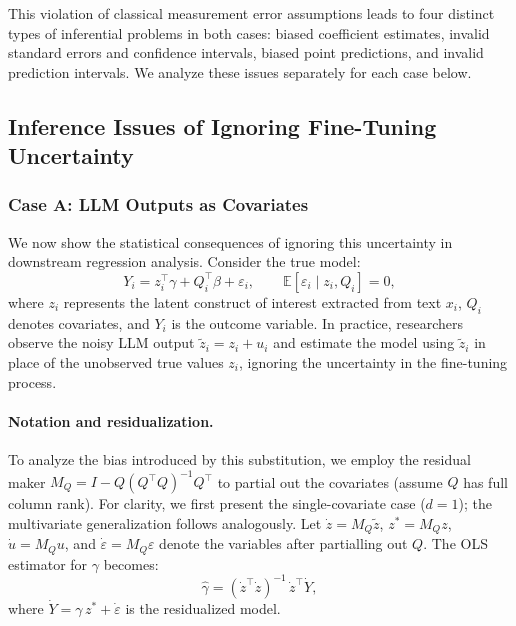 \documentclass[11pt]{article}
\begin{document}
This violation of classical measurement error assumptions leads to four distinct types of inferential problems in both cases:
biased coefficient estimates, invalid standard errors and confidence intervals, biased point predictions, and invalid prediction intervals.
We analyze these issues separately for each case below.

\subsection{Inference Issues of Ignoring Fine-Tuning Uncertainty}

\subsubsection{Case A: LLM Outputs as Covariates}

We now show the statistical consequences of ignoring this uncertainty in downstream regression analysis.
Consider the true model:
\begin{equation}
Y_i = z_i^\top\gamma + Q_i^\top\beta + \varepsilon_i,\qquad \mathbb{E}[\varepsilon_i \mid z_i,Q_i]=0,
\end{equation}
where $z_i$ represents the latent construct of interest extracted from text $x_i$, $Q_i$ denotes covariates, and $Y_i$ is the outcome variable.
In practice, researchers observe the noisy LLM output $\tilde z_i = z_i + u_i$ and estimate the model using $\tilde z_i$ in place of the unobserved true values $z_i$, ignoring the uncertainty in the fine-tuning process.

\paragraph{Notation and residualization.}
To analyze the bias introduced by this substitution, we employ the residual maker $M_Q = I - Q(Q^\top Q)^{-1}Q^\top$ to partial out the covariates (assume $Q$ has full column rank).
For clarity, we first present the single-covariate case ($d=1$); the multivariate generalization follows analogously.
Let $\dot z = M_Q \tilde z$, $z^\ast = M_Q z$, $\dot u = M_Q u$, and $\dot\varepsilon = M_Q \varepsilon$ denote the variables after partialling out $Q$.
The OLS estimator for $\gamma$ becomes:
\begin{equation}
\hat\gamma = (\dot z^\top \dot z)^{-1}\, \dot z^\top \dot Y,
\end{equation}
where $\dot Y = \gamma\, z^\ast + \dot\varepsilon$ is the residualized model.
\end{document}

